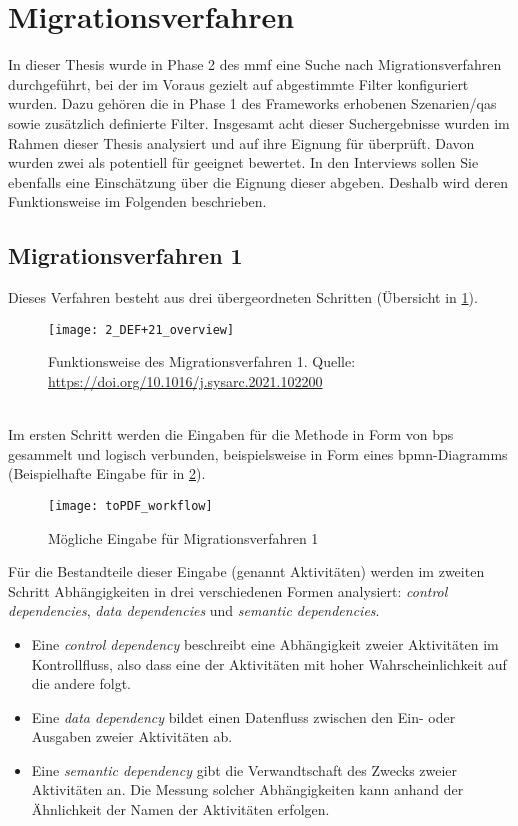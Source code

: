 \section{Migrationsverfahren}

In dieser Thesis wurde in Phase 2 des \gls{mmf} eine Suche nach Migrationsverfahren durchgeführt, bei der im Voraus gezielt auf \jf abgestimmte Filter konfiguriert wurden.
Dazu gehören die in Phase 1 des Frameworks erhobenen Szenarien/\glspl{qa} sowie zusätzlich definierte Filter. 
Insgesamt acht dieser Suchergebnisse wurden im Rahmen dieser Thesis analysiert und auf ihre Eignung für \jf überprüft.
Davon wurden zwei als potentiell für \jf geeignet bewertet.
In den Interviews sollen Sie ebenfalls eine Einschätzung über die Eignung dieser abgeben.
Deshalb wird deren Funktionsweise im Folgenden beschrieben.

\subsection{Migrationsverfahren 1}

Dieses Verfahren besteht aus drei übergeordneten Schritten (Übersicht in \cref{fig:interviews-migrationsverfahren1}).
\begin{figure}[!ht]
	\centering
	\texttt{[image: 2\_DEF+21\_overview]}
	\caption[Funktionsweise Migrationsverfahren 1]{
		Funktionsweise des Migrationsverfahren 1. Quelle: \url{https://doi.org/10.1016/j.sysarc.2021.102200}
	}
	\label{fig:interviews-migrationsverfahren1}
\end{figure} \\
Im ersten Schritt werden die Eingaben für die Methode in Form von \glspl{bp} gesammelt und logisch verbunden, beispielsweise in Form eines \gls{bpmn}-Diagramms (Beispielhafte Eingabe für \jf in \cref{fig:interview-eingabe-verfahren1}).

\begin{figure}[!ht]
	\centering
	\texttt{[image: toPDF\_workflow]}
	\caption[Mögliche Eingabe Migrationsverfahren 1]{
		Mögliche Eingabe für Migrationsverfahren 1
	}
	\label{fig:interview-eingabe-verfahren1}
\end{figure}

Für die Bestandteile dieser Eingabe (genannt Aktivitäten) werden im zweiten Schritt Abhängigkeiten in drei verschiedenen Formen analysiert: \emph{control dependencies}, \emph{data dependencies} und \emph{semantic dependencies}.
\begin{itemize}
	\item Eine \emph{control dependency} beschreibt eine Abhängigkeit zweier Aktivitäten im Kontrollfluss, also dass eine der Aktivitäten mit hoher Wahrscheinlichkeit auf die andere folgt.
	\item Eine \emph{data dependency} bildet einen Datenfluss zwischen den Ein- oder Ausgaben zweier Aktivitäten ab.
	\item Eine \emph{semantic dependency} gibt die Verwandtschaft des Zwecks zweier Aktivitäten an.
	Die Messung solcher Abhängigkeiten kann anhand der Ähnlichkeit der Namen der Aktivitäten erfolgen.
\end{itemize}

